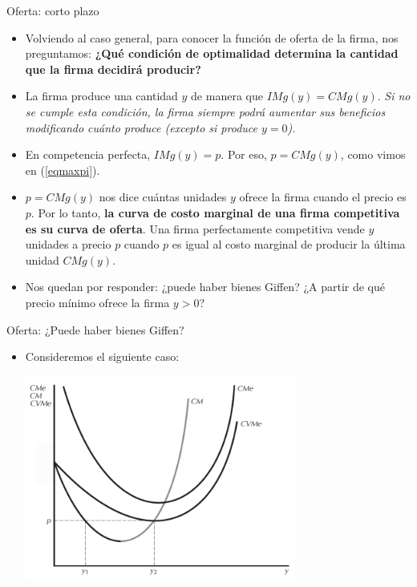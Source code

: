 \documentclass{beamer}
\theoremstyle{definition}
\begin{document}
\begin{frame}{Oferta: corto plazo}
\begin{itemize}
\item Volviendo al caso general, para conocer la función de oferta de la firma, nos preguntamos: \textbf{¿Qué condición de optimalidad determina la cantidad que la firma decidirá producir?}

\item La firma produce una cantidad $y$ de manera que $IMg(y)=CMg(y)$. \textit{Si no se cumple esta condición, la firma siempre podrá aumentar sus beneficios modificando cuánto produce (excepto si produce $y=0$).} %

\item En competencia perfecta, $IMg(y)=p$. Por eso, $p=CMg(y)$, como vimos en (\ref{eqmaxpi}).

\item $p=CMg(y)$ nos dice cuántas unidades $y$ ofrece la firma cuando el precio es $p$. Por lo tanto, \textbf{la curva de costo marginal de una firma competitiva es su curva de oferta}. Una firma perfectamente competitiva vende $y$ unidades a precio $p$ cuando $p$ es igual al costo marginal de producir la última unidad $CMg(y)$. 
\item Nos quedan por responder: ¿puede haber bienes Giffen? ¿A partir de qué precio mínimo ofrece la firma $y>0$? %
\end{itemize}
\end{frame}

\begin{frame}{Oferta: ¿Puede haber bienes Giffen?}
\begin{itemize}
\item Consideremos el siguiente caso:
\begin{center}
\includegraphics[width=3.5in]{figures4/doble.png}
\end{center}
\end{itemize}
\end{frame}
\end{document}

